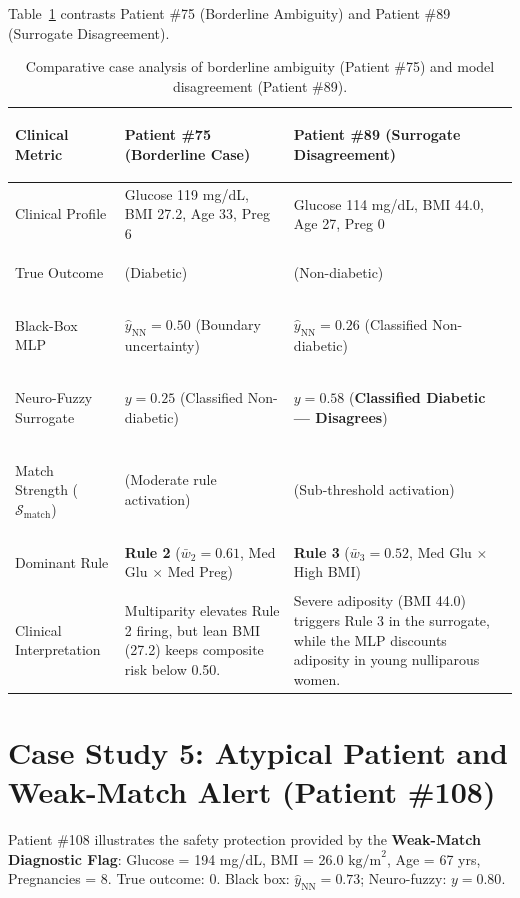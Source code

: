 \documentclass{report}
\begin{document}
Table~\ref{tab:case_ambiguity_summary} contrasts Patient \#75 (Borderline Ambiguity) and Patient \#89 (Surrogate Disagreement).

\begin{table}[htbp]
\centering
\footnotesize
\renewcommand{\arraystretch}{0.80}
\begin{tabularx}{\textwidth}{>{\bfseries\raggedright\arraybackslash}p{2.6cm} >{\raggedright\arraybackslash}X >{\raggedright\arraybackslash}X}
\toprule
\textbf{Clinical Metric} & \textbf{Patient \#75 (Borderline Case)} & \textbf{Patient \#89 (Surrogate Disagreement)} \\
\midrule
Clinical Profile & Glucose 119 mg/dL, BMI 27.2, Age 33, Preg 6 & Glucose 114 mg/dL, BMI 44.0, Age 27, Preg 0 \\
True Outcome & 1 (Diabetic) & 0 (Non-diabetic) \\
Black-Box MLP & $\hat{y}_{\text{NN}} = \mathbf{0.50}$ (Boundary uncertainty) & $\hat{y}_{\text{NN}} = \mathbf{0.26}$ (Classified Non-diabetic) \\
Neuro-Fuzzy Surrogate & $y = \mathbf{0.25}$ (Classified Non-diabetic) & $y = \mathbf{0.58}$ (\textbf{Classified Diabetic --- Disagrees}) \\
Match Strength ($\mathcal{S}_{\text{match}}$) & 0.62 (Moderate rule activation) & 0.38 (Sub-threshold activation) \\
Dominant Rule & \textbf{Rule 2} ($\bar{w}_2 = 0.61$, Med Glu $\times$ Med Preg) & \textbf{Rule 3} ($\bar{w}_3 = 0.52$, Med Glu $\times$ High BMI) \\
\midrule
Clinical Interpretation & Multiparity elevates Rule 2 firing, but lean BMI (27.2) keeps composite risk below 0.50. & Severe adiposity (BMI 44.0) triggers Rule 3 in the surrogate, while the MLP discounts adiposity in young nulliparous women. \\
\bottomrule
\end{tabularx}
\caption[Comparative Ambiguity and Disagreement Analysis]{Comparative case analysis of borderline ambiguity (Patient \#75) and model disagreement (Patient \#89).}
\label{tab:case_ambiguity_summary}
\end{table}

\section{Case Study 5: Atypical Patient and Weak-Match Alert (Patient \#108)}

Patient \#108 illustrates the safety protection provided by the \textbf{Weak-Match Diagnostic Flag}: Glucose = 194 mg/dL, BMI = 26.0 $\text{kg/m}^2$, Age = 67 yrs, Pregnancies = 8. True outcome: 0. Black box: $\hat{y}_{\text{NN}} = 0.73$; Neuro-fuzzy: $y = 0.80$.
\end{document}
